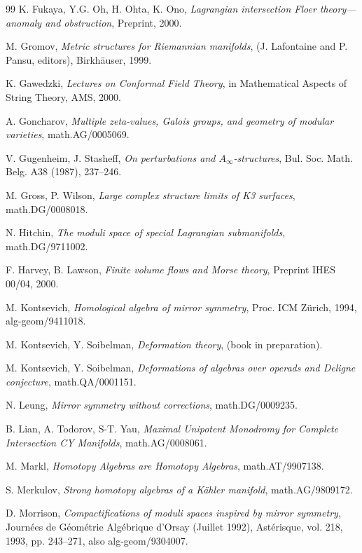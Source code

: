 \begin{thebibliography}{99}
 K. Fukaya, Y.G. Oh, H. Ohta, K. Ono, \textit{Lagrangian intersection Floer theory---anomaly and obstruction}, Preprint, 2000.

 M. Gromov, \textit{Metric structures for Riemannian manifolds}, (J. Lafontaine and P. Pansu, editors), Birkhäuser, 1999.

 K. Gawedzki, \textit{Lectures on Conformal Field Theory}, in Mathematical Aspects of String Theory, AMS, 2000.

 A. Goncharov, \textit{Multiple zeta-values, Galois groups, and geometry of modular varieties}, math.AG/0005069.

 V. Gugenheim, J. Stasheff, \textit{On perturbations and $A_\infty$-structures}, Bul. Soc. Math. Belg. A38 (1987), 237--246.

 M. Gross, P. Wilson, \textit{Large complex structure limits of K3 surfaces}, math.DG/0008018.

 N. Hitchin, \textit{The moduli space of special Lagrangian submanifolds}, math.DG/9711002.

 F. Harvey, B. Lawson, \textit{Finite volume flows and Morse theory}, Preprint IHES 00/04, 2000.

 M. Kontsevich, \textit{Homological algebra of mirror symmetry}, Proc. ICM Zürich, 1994, alg-geom/9411018.

 M. Kontsevich, Y. Soibelman, \textit{Deformation theory}, (book in preparation).

 M. Kontsevich, Y. Soibelman, \textit{Deformations of algebras over operads and Deligne conjecture}, math.QA/0001151.

 N. Leung, \textit{Mirror symmetry without corrections}, math.DG/0009235.

 B. Lian, A. Todorov, S-T. Yau, \textit{Maximal Unipotent Monodromy for Complete Intersection CY Manifolds}, math.AG/0008061.

 M. Markl, \textit{Homotopy Algebras are Homotopy Algebras}, math.AT/9907138.

 S. Merkulov, \textit{Strong homotopy algebras of a Kähler manifold}, math.AG/9809172.

 D. Morrison, \textit{Compactifications of moduli spaces inspired by mirror symmetry}, Journées de Géométrie Algébrique d'Orsay (Juillet 1992), Astérisque, vol. 218, 1993, pp. 243--271, also alg-geom/9304007.


\end{thebibliography}
